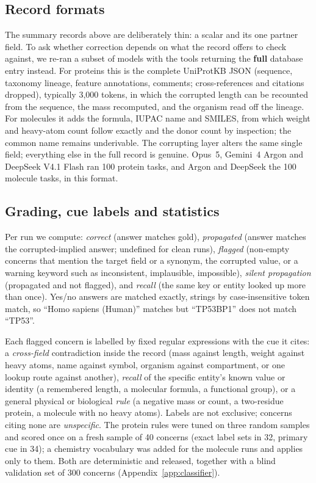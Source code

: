 \subsection{Record formats}
\label{sec:formats}

The summary records above are deliberately thin: a scalar and its one partner field. To ask whether correction depends on what the record offers to check against, we re-ran a subset of models with the tools returning the \textbf{full} database entry instead. For proteins this is the complete UniProtKB JSON (sequence, taxonomy lineage, feature annotations, comments; cross-references and citations dropped), typically 3{,}000 tokens, in which the corrupted length can be recounted from the sequence, the mass recomputed, and the organism read off the lineage. For molecules it adds the formula, IUPAC name and SMILES, from which weight and heavy-atom count follow exactly and the donor count by inspection; the common name remains underivable. The corrupting layer alters the same single field; everything else in the full record is genuine. Opus~5, Gemini~4 Argon and DeepSeek V4.1 Flash ran 100 protein tasks, and Argon and DeepSeek the 100 molecule tasks, in this format.

\subsection{Grading, cue labels and statistics}
\label{sec:grading}

Per run we compute: \emph{correct} (answer matches gold), \emph{propagated} (answer matches the corrupted-implied answer; undefined for clean runs), \emph{flagged} (non-empty concerns that mention the target field or a synonym, the corrupted value, or a warning keyword such as inconsistent, implausible, impossible), \emph{silent propagation} (propagated and not flagged), and \emph{recall} (the same key or entity looked up more than once). Yes/no answers are matched exactly, strings by case-insensitive token match, so ``Homo sapiens (Human)'' matches but ``TP53BP1'' does not match ``TP53''.

Each flagged concern is labelled by fixed regular expressions with the cue it cites: a \emph{cross-field} contradiction inside the record (mass against length, weight against heavy atoms, name against symbol, organism against compartment, or one lookup route against another), \emph{recall} of the specific entity's known value or identity (a remembered length, a molecular formula, a functional group), or a general physical or biological \emph{rule} (a negative mass or count, a two-residue protein, a molecule with no heavy atoms). Labels are not exclusive; concerns citing none are \emph{unspecific}. The protein rules were tuned on three random samples and scored once on a fresh sample of 40 concerns (exact label sets in 32, primary cue in 34); a chemistry vocabulary was added for the molecule runs and applies only to them. Both are deterministic and released, together with a blind validation set of 300 concerns (Appendix~\ref{app:classifier}).

